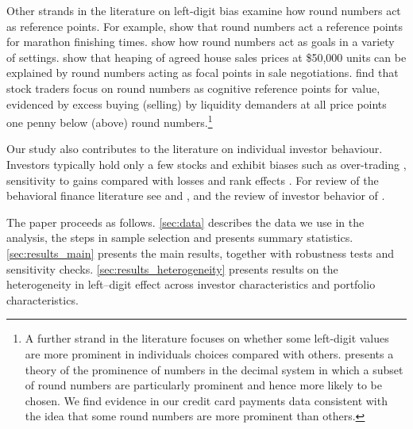 Other strands in the literature on left-digit bias examine how round numbers act as reference points. For example, \cite{allen2016reference} show that round numbers act a reference points for marathon finishing times. \cite{pope2011round} show how round numbers act as goals in a variety of settings. \cite{pope2015focal} show that heaping of agreed house sales prices at \$50,000 units can be explained by round numbers acting as focal points in sale negotiations. \cite{bhattacharya2012penny} find that stock traders focus on round numbers as cognitive reference points for value, evidenced by excess buying (selling) by liquidity demanders at all price points one penny below (above) round numbers.\footnote{A further strand in the literature focuses on whether some left-digit values are more prominent in individuals choices compared with others. \cite{albers1983prominence} presents a theory of the prominence of numbers in the decimal system in which a subset of round numbers are particularly prominent and hence more likely to be chosen. We find evidence in our credit card payments data consistent with the idea that some round numbers are more prominent than others.}

Our study also contributes to the literature on individual investor behaviour. Investors typically hold only a few stocks and exhibit biases such as over-trading \citep{barber2000}, sensitivity to gains compared with losses \citep{odean1998} and rank effects \citep{hartzmark2015}. For review of the behavioral finance literature see \cite{hirshleifer2015} and \cite{barberis2018}, and the review of investor behavior of \cite{barber2013}.

The paper proceeds as follows. \ref{sec:data} describes the data we use in the analysis, the steps in sample selection and presents summary statistics. \ref{sec:results_main} presents the main results, together with robustness tests and sensitivity checks. \ref{sec:results_heterogeneity} presents results on the heterogeneity in left--digit effect across investor characteristics and portfolio characteristics. 


